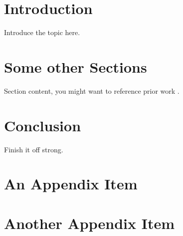 \documentclass[12pt]{article}
\begin{document}


\tableofcontents
\listoffigures
\listoftables

\pagebreak
\section{Introduction}
Introduce the topic here.

\section{Some other Sections}
Section content, you might want to reference prior work \cite{example}.

\section{Conclusion}
Finish it off strong.

\pagebreak
\printbibliography

\appendix
\section{An Appendix Item}
\section{Another Appendix Item}
\end{document}
